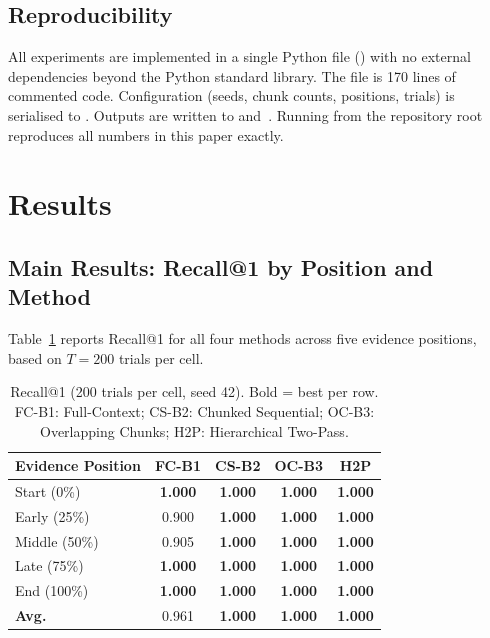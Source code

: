 \documentclass[sigconf,nonacm]{acmart}
\begin{document}
\subsection{Reproducibility}

All experiments are implemented in a single Python file
() with no external dependencies beyond the Python
standard library. The file is 170 lines of commented code.
Configuration (seeds, chunk counts, positions, trials) is serialised to
. Outputs are written to 
and~. Running 
from the repository root reproduces all numbers in this paper exactly.

\section{Results}
\label{sec:results}

\subsection{Main Results: Recall@1 by Position and Method}

Table~\ref{tab:main} reports Recall@1 for all four methods across five evidence
positions, based on $T = 200$ trials per cell.

\begin{table}[t]
  \centering
  \caption{Recall@1 (200 trials per cell, seed 42). Bold = best per row.
           FC-B1: Full-Context; CS-B2: Chunked Sequential;
           OC-B3: Overlapping Chunks; H2P: Hierarchical Two-Pass.}
  \label{tab:main}
  \begin{tabular}{lcccc}
    \toprule
    Evidence Position & FC-B1 & CS-B2 & OC-B3 & H2P \\
    \midrule
    Start (0\%)       & \textbf{1.000} & \textbf{1.000} & \textbf{1.000} & \textbf{1.000} \\
    Early (25\%)      & 0.900 & \textbf{1.000} & \textbf{1.000} & \textbf{1.000} \\
    Middle (50\%)     & 0.905 & \textbf{1.000} & \textbf{1.000} & \textbf{1.000} \\
    Late  (75\%)      & \textbf{1.000} & \textbf{1.000} & \textbf{1.000} & \textbf{1.000} \\
    End   (100\%)     & \textbf{1.000} & \textbf{1.000} & \textbf{1.000} & \textbf{1.000} \\
    \midrule
    \textbf{Avg.}     & 0.961 & \textbf{1.000} & \textbf{1.000} & \textbf{1.000} \\
    \bottomrule
  \end{tabular}
\end{table}
\end{document}
